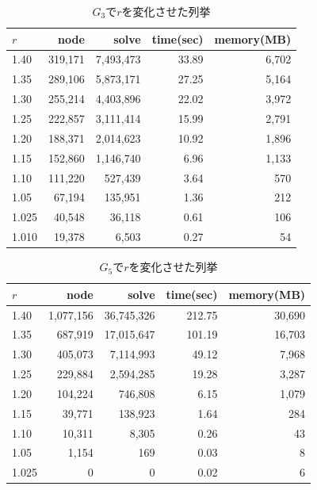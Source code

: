 \begin{table}[htbp]
  \caption{$G_3$で$r$を変化させた列挙}
  \label{table:g3_r}
  \centering
  \begin{tabular}{l||r|r|r|r}
    \hline
    $r$ & node & solve & time(sec) & memory(MB) \\
    \hline \hline
    1.40 & 319{,}171 & 7{,}493{,}473 &	33.89 &	6{,}702 \\
    1.35 & 289{,}106 &	5{,}873{,}171 &	27.25 &	5{,}164 \\
    1.30 & 255{,}214	& 4{,}403{,}896	& 22.02	& 3{,}972 \\
    1.25 & 222{,}857	& 3{,}111{,}414	& 15.99	& 2{,}791 \\
    1.20 & 188{,}371	& 2{,}014{,}623	& 10.92	& 1{,}896 \\
    1.15 & 152{,}860	& 1{,}146{,}740	& 6.96	& 1{,}133 \\
    1.10 & 111{,}220	& 527{,}439	& 3.64	& 570 \\
    1.05 & 67{,}194	& 135{,}951	& 1.36	& 212 \\
    1.025 & 40{,}548	& 36{,}118	& 0.61	& 106 \\
    1.010 & 19{,}378	& 6{,}503 & 0.27 & 54 \\
    \hline
  \end{tabular}
\end{table}

\begin{table}[htbp]
  \caption{$G_5$で$r$を変化させた列挙}
  \label{table:g5_r}
  \centering
  \begin{tabular}{l||r|r|r|r}
    \hline
    $r$ & node & solve & time(sec) & memory(MB) \\
    \hline \hline
    1.40	& 1{,}077{,}156	& 36{,}745{,}326 & 212.75	& 30{,}690 \\
    1.35	& 687{,}919	& 17{,}015{,}647 & 101.19	& 16{,}703 \\
    1.30	& 405{,}073	& 7{,}114{,}993	& 49.12 & 7{,}968 \\
    1.25	& 229{,}884	& 2{,}594{,}285	& 19.28 & 3{,}287 \\
    1.20	& 104{,}224	& 746{,}808	& 6.15	& 1{,}079 \\
    1.15	& 39{,}771	& 138{,}923	& 1.64	& 284 \\
    1.10	& 10{,}311	& 8{,}305	& 0.26	& 43 \\
    1.05	& 1{,}154	& 169	& 0.03	& 8 \\
    1.025	& 0	& 0	& 0.02	& 6 \\
    \hline
  \end{tabular}
\end{table}

